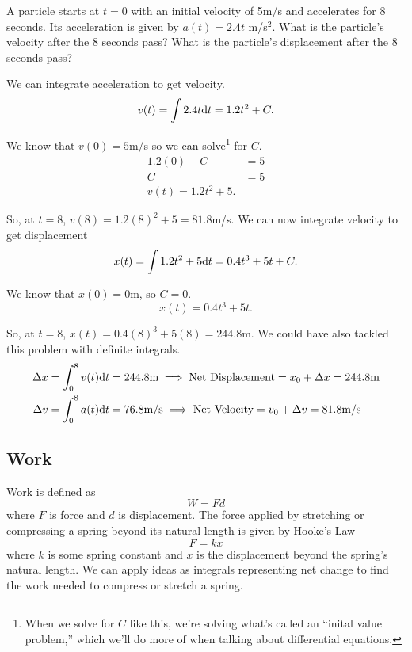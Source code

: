 \begin{example}
	A particle starts at $t=0$ with an initial velocity of 5m/s and accelerates for 8 seconds.
	Its acceleration is given by $a(t)=2.4t$ m/s$^2$.
	What is the particle's velocity after the 8 seconds pass?
	What is the particle's displacement after the 8 seconds pass?
\end{example}
\begin{answer}
	We can integrate acceleration to get velocity.
	\begin{equation*}
		v(t) = \int{2.4t\mathrm{d} t} = 1.2t^2 + C.
	\end{equation*}
	
	We know that $v(0)=5$m/s so we can solve\footnote{When we solve for $C$ like this, we're solving what's called an ``inital value problem,'' which we'll do more of when talking about differential equations.} for $C$.
	\begin{align*}
		1.2(0) + C &= 5 \\
		C &= 5 \\
		v(t) = 1.2t^2 + 5.
	\end{align*}
	
	So, at $t=8$, $v(8) = 1.2(8)^2 + 5 = 81.8$m/s.
	We can now integrate velocity to get displacement
	\begin{equation*}
		x(t) = \int{1.2t^2 + 5 \mathrm{d} t} = 0.4t^3 + 5t + C.
	\end{equation*}
	
	We know that $x(0)=0$m, so $C=0$.
	\begin{equation*}
		x(t) = 0.4t^3 + 5t.
	\end{equation*}
	
	So, at $t=8$, $x(t) = 0.4(8)^3 + 5(8) = 244.8$m.
	We could have also tackled this problem with definite integrals.
	\begin{align*}
		\Delta x = \int_{0}^{8}{v(t)\mathrm{d} t} &= 244.8\text{m} \implies \text{Net Displacement} = x_0 + \Delta x = 244.8\text{m} \\
		\Delta v = \int_{0}^{8}{a(t)\mathrm{d} t} &= 76.8\text{m/s} \implies \text{Net Velocity} = v_0 + \Delta v = 81.8\text{m/s}
	\end{align*}
\end{answer}

\subsection{Work}
Work is defined as
\begin{equation*}
	W = Fd
\end{equation*}
where $F$ is force and $d$ is displacement.
The force applied by stretching or compressing a spring beyond its natural length is given by Hooke's Law
\begin{equation*}
	F = kx
\end{equation*}
where $k$ is some spring constant and $x$ is the displacement beyond the spring's natural length.
We can apply ideas as integrals representing net change to find the work needed to compress or stretch a spring.

